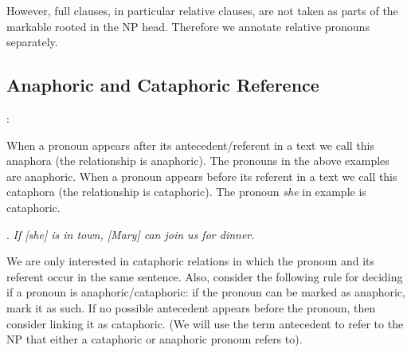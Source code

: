 \documentclass[a4paper]{article}
\begin{document}
However, full clauses, in particular relative clauses, are not taken as parts of the markable rooted in the NP head. Therefore we annotate relative pronouns separately.

\subsection{Anaphoric and Cataphoric Reference}

\cite[p. 4]{GuillouEtAlGuide}:

When a pronoun appears after its antecedent/referent in a text we call this anaphora (the relationship is anaphoric). The pronouns in the above examples are anaphoric. When a pronoun appears before its referent in a text we call this
cataphora (the relationship is cataphoric). The pronoun {\sl she} in example \Next is cataphoric.

\ex.
{\sl If [she] is in town, [Mary] can join us for dinner.}

We are only interested in cataphoric relations in which the pronoun and its referent occur in the same sentence. Also, consider the following rule for deciding if a pronoun is anaphoric/cataphoric: if the pronoun can be marked as anaphoric, mark it as such. If no possible antecedent appears before the pronoun, then consider linking it as cataphoric. (We will use the term antecedent to refer to
the NP that either a cataphoric or anaphoric pronoun refers to).
\end{document}

